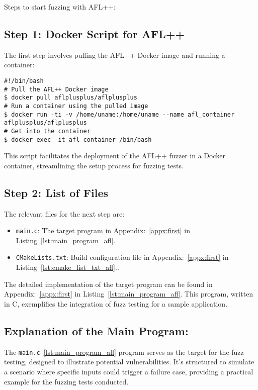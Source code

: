 Steps to start fuzzing with AFL++:

\subsection*{Step 1: Docker Script for AFL++}
\label{subsec:docker script for afl-fuzz}
The first step involves pulling the AFL++ Docker image and running a container:
\begin{verbatim}
#!/bin/bash
# Pull the AFL++ Docker image
$ docker pull aflplusplus/aflplusplus
# Run a container using the pulled image
$ docker run -ti -v /home/uname:/home/uname --name afl_container aflplusplus/aflplusplus
# Get into the container
$ docker exec -it afl_container /bin/bash
\end{verbatim}

This script facilitates the deployment of the AFL++ fuzzer in a Docker container,
streamlining the setup process for fuzzing tests.

\subsection*{Step 2: List of Files}
The relevant files for the next step are:
\begin{itemize}
    \item \texttt{main.c}: The target program
    in Appendix:~\ref{appx:first} in Listing~\ref{lst:main_program_afl}.
    \item \texttt{CMakeLists.txt}: Build configuration file
    in Appendix:~\ref{appx:first} in Listing~\ref{lst:cmake_list_txt_afl}..
\end{itemize}

The detailed implementation of the target program can be
found in Appendix:~\ref{appx:first} in Listing~\ref{lst:main_program_afl}. This program, written
in C, exemplifies the integration of fuzz testing for a sample application.

\subsection*{Explanation of the Main Program:}
The \texttt{main.c}~\ref{lst:main_program_afl} program serves as the target for the fuzz testing,
designed to illustrate potential vulnerabilities.
It's structured to simulate a scenario where specific inputs could trigger a
failure case, providing a practical example for the fuzzing tests conducted.

